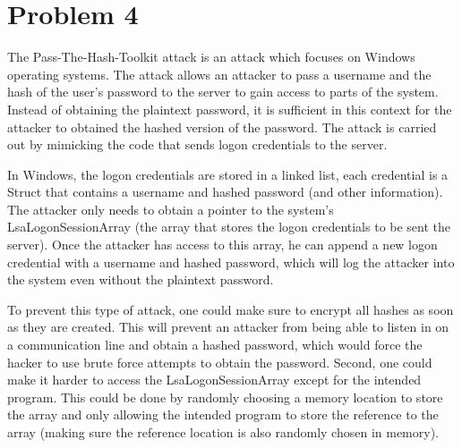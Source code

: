 \documentclass[psamsfonts]{amsart}
\begin{document}
\section{Problem 4}

The Pass-The-Hash-Toolkit attack is an attack which focuses on Windows operating systems. The attack allows an attacker to pass a username and the hash of the user's password to the server to gain access to parts of the system. Instead of obtaining the plaintext password, it is sufficient in this context for the attacker to obtained the hashed version of the password. The attack is carried out by mimicking the code that sends logon credentials to the server.

In Windows, the logon credentials are stored in a linked list, each credential is a Struct that contains a username and hashed password (and other information). The attacker only needs to obtain a pointer to the system's LsaLogonSessionArray (the array that stores the logon credentials to be sent the server). Once the attacker has access to this array, he can append a new logon credential with a username and hashed password, which will log the attacker into the system even without the plaintext password.

To prevent this type of attack, one could make sure to encrypt all hashes as soon as they are created. This will prevent an attacker from being able to listen in on a communication line and obtain a hashed password, which would force the hacker to use brute force attempts to obtain the password. Second, one could make it harder to access the LsaLogonSessionArray except for the intended program. This could be done by randomly choosing a memory location to store the array and only allowing the intended program to store the reference to the array (making sure the reference location is also randomly chosen in memory).
\end{document}
